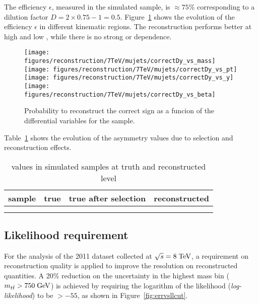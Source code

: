 The efficiency $\epsilon$, measured in the \ttbar{} simulated sample,
is $\approx75\%$ corresponding to a dilution factor
$D=2\times0.75-1=0.5$.
Figure~\ref{fig:dysign} shows the evolution of the efficiency $\epsilon$
in different kinematic regions. The \dy{} reconstruction performs
better at high \mtt{} and low \pttt{}, while there is no strong \ytt{}
or \betatt{} dependence. 

\begin{figure}[!htb]\centering
  \texttt{[image: figures/reconstruction/7TeV/mujets/correctDy\_vs\_mass]}
  \texttt{[image: figures/reconstruction/7TeV/mujets/correctDy\_vs\_pt]}
  \texttt{[image: figures/reconstruction/7TeV/mujets/correctDy\_vs\_y]}
  \texttt{[image: figures/reconstruction/7TeV/mujets/correctDy\_vs\_beta]}
  \caption{
    \label{fig:dysign}
    Probability to reconstruct the correct \dy{} sign as a funcion of
    the differential variables for the \mujets{} sample.
  }
\end{figure}

Table~\ref{tab:actruthreco} shows the evolution of the asymmetry
values due to selection and reconstruction effects.

\begin{table}[!htb]\centering
  \begin{tabular}{ l c c c}
    \toprule
    sample      & true \ac{} & true \ac{} after selection & reconstructed \ac{}\\
    \midrule
    \powheg{} &                &     &    \\
    \mcatnlo{} &                &     &    \\
    \bottomrule
  \end{tabular}
  \caption{\ac{} values in simulated \ttbar{} samples at truth and
    reconstructed level}
  \label{tab:actruthreco}
\end{table}

\subsection{Likelihood requirement}
\label{sec:Reconstruction:lhood}

For the analysis of the 2011 dataset collected at $\sqrt{s} = 8
\; \mathrm{TeV}{}$, a requirement on reconstruction quality is applied to improve
the resolution on reconstructed quantities.
A 20\% reduction on the \ac{} uncertainty in the highest mass bin ($\mbox{$m_{t\bar{t}}$}{}>750\; \mathrm{GeV}{}$)
is achieved by requiring the logarithm of the likelihood ({\it log-likelihood}) to be $>-55$,
as shown in Figure~\ref{fig:errvsllcut}.

